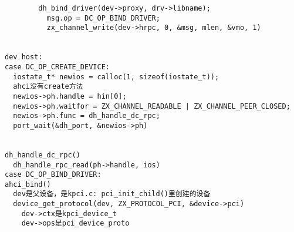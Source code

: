 \begin{verbatim}
        dh_bind_driver(dev->proxy, drv->libname);
          msg.op = DC_OP_BIND_DRIVER;
          zx_channel_write(dev->hrpc, 0, &msg, mlen, &vmo, 1)


dev host:
case DC_OP_CREATE_DEVICE:
  iostate_t* newios = calloc(1, sizeof(iostate_t));
  ahci没有create方法
  newios->ph.handle = hin[0];
  newios->ph.waitfor = ZX_CHANNEL_READABLE | ZX_CHANNEL_PEER_CLOSED;
  newios->ph.func = dh_handle_dc_rpc;
  port_wait(&dh_port, &newios->ph)


dh_handle_dc_rpc()
  dh_handle_rpc_read(ph->handle, ios)
case DC_OP_BIND_DRIVER:
ahci_bind()
  dev是父设备，是kpci.c: pci_init_child()里创建的设备
  device_get_protocol(dev, ZX_PROTOCOL_PCI, &device->pci)
    dev->ctx是kpci_device_t
    dev->ops是pci_device_proto
  
\end{verbatim}